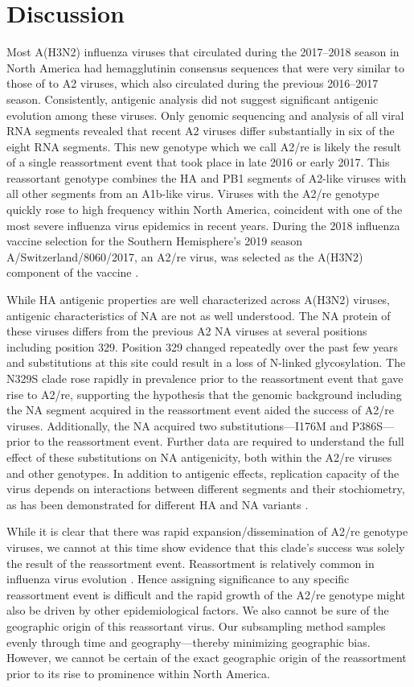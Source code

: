 \section*{Discussion}
Most A(H3N2) influenza viruses that circulated during the 2017--2018 season in North America had hemagglutinin consensus sequences that were very similar to those of to A2 viruses, which also circulated during the previous 2016--2017 season.
Consistently, antigenic analysis did not suggest significant antigenic evolution among these viruses.
Only genomic sequencing and analysis of all viral RNA segments revealed that recent A2 viruses differ substantially in six of the eight RNA segments.
This new genotype which we call A2/re is likely the result of a single reassortment event that took place in late 2016 or early 2017.
This reassortant genotype combines the HA and PB1 segments of A2-like viruses with all other segments from an A1b-like virus.
Viruses with the A2/re genotype quickly rose to high frequency within North America, coincident with one of the most severe influenza virus epidemics in recent years.
During the 2018 influenza vaccine selection for the Southern Hemisphere's 2019 season A/Switzerland/8060/2017, an A2/re virus, was selected as the A(H3N2) component of the vaccine \citep{barr_epidemiological_2010}.

While HA antigenic properties are well characterized across A(H3N2) viruses, antigenic characteristics of NA are not as well understood.
The NA protein of these viruses differs from the previous A2 NA viruses at several positions including position 329.
Position 329 changed repeatedly over the past few years and substitutions at this site could result in a loss of N-linked glycosylation.
The N329S clade rose rapidly in prevalence prior to the reassortment event that gave rise to A2/re, supporting the hypothesis that the genomic background including the NA segment acquired in the reassortment event aided the success of A2/re viruses.
Additionally, the NA acquired two substitutions---I176M and P386S---prior to the reassortment event.
Further data are required to understand the full effect of these substitutions on NA antigenicity, both within the A2/re viruses and other genotypes.
In addition to antigenic effects, replication capacity of the virus depends on interactions between different segments and their stochiometry, as has been demonstrated for different HA and NA variants \citep{Yen14264}.

While it is clear that there was rapid expansion/dissemination of A2/re genotype viruses, we cannot at this time show evidence that this clade's success was solely the result of the reassortment event.
Reassortment is relatively common in influenza virus evolution \citep{10.1371/journal.pbio.0030300, 10.1371/journal.ppat.1000012}.
Hence assigning significance to any specific reassortment event is difficult and the rapid growth of the A2/re genotype might also be driven by other epidemiological factors.
We also cannot be sure of the geographic origin of this reassortant virus.
Our subsampling method samples evenly through time and geography---thereby minimizing geographic bias.
However, we cannot be certain of the exact geographic origin of the reassortment prior to its rise to prominence within North America.

